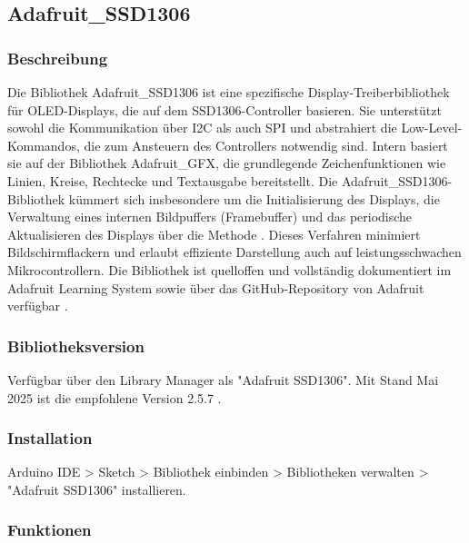 {
	\label{lst:AdafruitGFX-Example}
}

\subsection{Adafruit\_SSD1306} \label{sec:Adafruit_SSD1306.h}

\subsubsection{Beschreibung}

Die Bibliothek Adafruit\_SSD1306 ist eine spezifische Display-Treiberbibliothek für OLED-Displays, die auf dem SSD1306-Controller basieren. Sie unterstützt sowohl die Kommunikation über I2C als auch SPI und abstrahiert die Low-Level-Kommandos, die zum Ansteuern des Controllers notwendig sind. Intern basiert sie auf der Bibliothek Adafruit\_GFX, die grundlegende Zeichenfunktionen wie Linien, Kreise, Rechtecke und Textausgabe bereitstellt. Die Adafruit\_SSD1306-Bibliothek kümmert sich insbesondere um die Initialisierung des Displays, die Verwaltung eines internen Bildpuffers (Framebuffer) und das periodische Aktualisieren des Displays über die Methode . Dieses Verfahren minimiert Bildschirmflackern und erlaubt effiziente Darstellung auch auf leistungsschwachen Mikrocontrollern. Die Bibliothek ist quelloffen und vollständig dokumentiert im Adafruit Learning System sowie über das GitHub-Repository von Adafruit verfügbar \cite{Adafruit:2024OLED}\cite{Adafruit:2024GFXLibrary}.

\subsubsection{Bibliotheksversion}

Verfügbar über den Library Manager als "Adafruit SSD1306". Mit Stand Mai 2025 ist die empfohlene Version 2.5.7 \cite{Adafruit:2024GFXLibrary}.

\subsubsection{Installation}

Arduino IDE > Sketch > Bibliothek einbinden > Bibliotheken verwalten > "Adafruit SSD1306" installieren.

\subsubsection{Funktionen}

